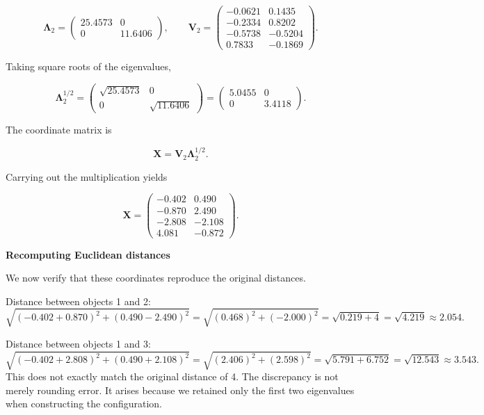 \[
\mathbf{\Lambda}_2
=
\begin{pmatrix}
25.4573 & 0 \\
0 & 11.6406
\end{pmatrix},
\qquad
\mathbf{V}_2
=
\begin{pmatrix}
-0.0621 & 0.1435 \\
-0.2334 & 0.8202 \\
-0.5738 & -0.5204 \\
0.7833 & -0.1869
\end{pmatrix}.
\]

Taking square roots of the eigenvalues,

\[
\mathbf{\Lambda}_2^{1/2}
=
\begin{pmatrix}
\sqrt{25.4573} & 0 \\
0 & \sqrt{11.6406}
\end{pmatrix}
=
\begin{pmatrix}
5.0455 & 0 \\
0 & 3.4118
\end{pmatrix}.
\]

The coordinate matrix is

\[
\mathbf{X}
=
\mathbf{V}_2 \mathbf{\Lambda}_2^{1/2}.
\]

Carrying out the multiplication yields

\[
\mathbf{X}
=
\begin{pmatrix}
-0.402 & 0.490 \\
-0.870 & 2.490 \\
-2.808 & -2.108 \\
4.081 & -0.872
\end{pmatrix}.
\]

\medskip
\noindent
\textbf{Recomputing Euclidean distances}

\medskip

We now verify that these coordinates reproduce the original distances.

\medskip

Distance between objects 1 and 2:
\[
\sqrt{
(-0.402 + 0.870)^2
+
(0.490 - 2.490)^2
}
=
\sqrt{
(0.468)^2 + (-2.000)^2
}
=
\sqrt{0.219 + 4}
=
\sqrt{4.219}
\approx 2.054.
\]

\medskip

Distance between objects 1 and 3:
\[
\sqrt{
(-0.402 + 2.808)^2
+
(0.490 + 2.108)^2
}
=
\sqrt{
(2.406)^2 + (2.598)^2
}
=
\sqrt{5.791 + 6.752}
=
\sqrt{12.543}
\approx 3.543.
\]
This does not exactly match the original distance of 4.
The discrepancy is not merely rounding error. It arises because we
retained only the first two eigenvalues when constructing the
configuration.

